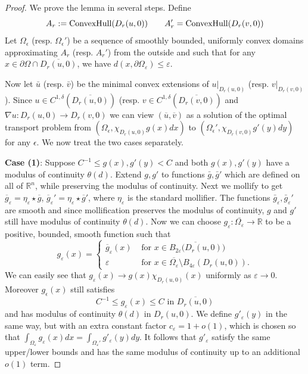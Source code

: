 \documentclass[12pt,reqno]{amsart}
\newcommand{\eps}{\varepsilon}
\numberwithin{equation}{section}
\begin{document}
\begin{proof}
    We prove the lemma in several steps.  Define
     \[
    A_{r}:={\rm Convex Hull}(D_r(u,0)) \qquad A_r' = {\rm Convex Hull}(D_r(v,0))
    \]
    Let $\Omega_{\epsilon}$ (resp. $\Omega_{\epsilon}'$) be a sequence of smoothly bounded, uniformly convex domains approximating $A_r$ (resp. $A_r'$) from the outside and such that for any $x\in \partial\Omega\cap \overline{D_r(u, 0)}$, we have $d(x, \partial\Omega_{\eps})\leq \eps$. 
    
    Now let $\bar{u}$ (resp. $\bar{v}$) be the minimal convex extensions of $u\big|_{D_{r}(u,0)}$ (resp. $v\big|_{D_{r}(v,0)}$). Since $u \in C^{1,\delta}(\overline{D_r(u,0)})$ (resp. $v \in C^{1,\delta}(\overline{D_r(v,0)})$ and $\nabla u: D_r(u,0) \rightarrow D_{r}(v,0)$
    we can view $(\overline{u},\overline{v})$ as a solution of the optimal transport problem from $(\Omega_{\epsilon}, \chi_{D_{r}(u,0)}g(x)dx)$ to $(\Omega_{\epsilon}', \chi_{D_{r}(v,0)}g'(y)dy)$ for any $\epsilon$.  We now treat the two cases separately.
\bigskip

{\bf Case (1)}:  Suppose $C^{-1}\leq g(x), g'(y)<C$
        and both $g(x), g'(y)$ have a modulus of continuity $\theta(d)$.  Extend $g,g'$ to functions $\bar g, \bar g'$ which are defined on all of $\mathbb{R}^n$, while preserving the modulus of continuity.  Next we mollify to get $\overline g_{\eps} = \eta_{\eps}\star\overline g$, $\overline g_{\eps}' = \eta_{\eps}\star\overline g'$, where $\eta_{\eps}$ is the standard mollifier. The functions $\bar g_{\eps}, \bar g_{\eps}'$ are smooth and since mollification preserves the modulus of continuity,  $g$ and $g'$ still have modulus of continuity $\theta(d)$. Now we can choose $g_{\eps}:\overline{\Omega_{\eps}}\to \mathbb R$ to be a positive, bounded, smooth function such that
        \[g_{\eps}(x) = \begin{cases}
        \overline g_{\eps}(x)&\text{ for }x\in \overline{B_{2\eps}(D_r(u, 0)})\\
        \eps &\text{ for }x\in \overline{\Omega_{\eps}}\setminus B_{4\eps}(D_{r}(u, 0)). 
        \end{cases}\]
        We can easily see that $g_{\eps}(x)\rightarrow  g(x)\chi_{D_r(u, 0)}(x)$ uniformly as $\eps\to 0$. Moreover $g_{\epsilon}(x)$ still satisfies 
        \[C^{-1}\leq g_{\eps}(x)\leq C
        \text{ in }\overline{D_r(u, 0)}\]
        and has modulus of continuity $\theta(d)$ in $D_r(u, 0)$. We define $g'_{\eps}(y)$ in the same way, but with an extra constant factor $c_{\eps} = 1+o(1)$, which is chosen so that $\int_{\Omega_{\eps}}g_{\eps}(x)dx = \int_{\Omega_{\eps}'}g'_{\eps}(y)dy$. It follows that $g'_{\eps}$ satisfy the same upper/lower bounds and has the same modulus of continuity up to an additional $o(1)$ term.
\bigskip


\end{proof}
\end{document}
